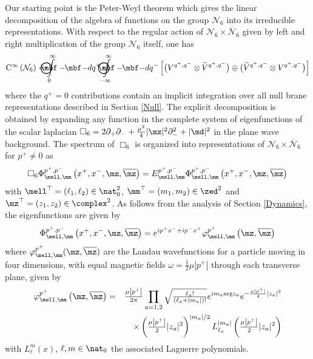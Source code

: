Our starting point is the Peter-Weyl theorem which gives the
linear decomposition of the algebra of functions on the group $\mathcal{N}_6$
into its irreducible representations. With respect to the regular
action of $\mathcal{N}_6\times\overline{\mathcal{N}}_6$ given by left
and right multiplication of the group $\mathcal{N}_6$ itself, one has
\begin{equation}
{\rm C}^\infty\left(\mathcal{N}_6\right)= {\int\limits_0^\infty
\!\!\!\!\!\!\!\!\!\!\!\!  \bigodot\!\!\!\!\!\!\!\!\!\!\mbf-\!\!
\mbf-}  d q^+  {\int\limits_{-\infty}^\infty
\!\!\!\!\!\!\!\!\!\!\!\! \bigodot\!\!\!\!\!\!\!\!\!\!\mbf-\!\!
\mbf-}  d q^- \left[\bigl(V^{q^+,q^-}\otimes\widetilde{V}
{}^{q^+,q^-}\bigr)\oplus\bigl(\widetilde{V}
{}^{q^+,q^-}\otimes V^{q^+,q^-}\bigr)\right]
\label{PeterWeylthm}\end{equation}
where the $q^+=0$ contributions contain an implicit integration over all null
brane representations described in Section \ref{Null}. The explicit
decomposition is obtained by expanding any function in the complete
system of eigenfunctions of the scalar laplacian
$\Box_6=2 \partial_+ \partial_-+\frac{\mu^2}4 |\mz|^2 
\partial_-^2+|\md|^2$ in the plane wave background. The spectrum of
$\Box_6$ is organized into representations of
$\mathcal{N}_6\times\overline{\mathcal{N}}_6$ for $p^+\neq0$ as
\begin{equation}
\Box_6\Phi_{\mell,\mm}^{p^+,p^-}\left(x^+,x^-,\mz,\overline{\mz} \right)=
E_{\mell,\mm}^{p^+,p^-} \Phi_{\mell,\mm}^{p^+,p^-}\left(x^+,x^-,\mz,
\overline{\mz} \right)
\label{Box6eigeneq}\end{equation}
with $\mell^\top=(\ell_1,\ell_2)\in\nat_0^2$, $\mm^\top=(m_1,m_2)\in\zed^2$ and
$\mz^\top=(z_1,z_2)\in\complex^2$. As follows from the analysis of
Section \ref{Dynamics}, the eigenfunctions are given by
\begin{equation}
\Phi_{\mell,\mm}^{p^+,p^-}\left(x^+,x^-,\mz,\overline{\mz} \right)=
 e^{ i p^+x^-+ i
  p^-x^+} \varphi^{p^+}_{\mell,\mm}\left(\mz,\overline{\mz} \right)
\label{Box6eigenfns}\end{equation}
where $\varphi^{p^+}_{\mell,\mm}(\mz,\overline{\mz} )$ are the Landau
wavefunctions for a particle moving in four dimensions, with equal
magnetic fields $\omega=\frac12 \mu |p^+|$ through each transverse
plane, given by
\begin{eqnarray}
\varphi^{p^+}_{\mell,\mm}\left(\mz,\overline{\mz} \right)&=&
\mbox{$\frac{\mu \left|p^+\right|}{2\pi}$} 
\prod_{a=1,2}\sqrt{\mbox{$\frac{\ell_a!}{(\ell_a+|m_a|)!}$}} 
 e^{ i m_a {\rm arg} z_a}  e^{-\frac{\mu |p^+|}4 |z_a|^2}\nonumber\\&&
\times \left(\mbox{$\frac{\mu \left|p^+\right|}2$} |z_a|^2\right)^{|m_a|/2} 
L_{\ell_a}^{|m_a|}\left(\mbox{$\frac{\mu \left|p^+\right|}2$} |z_a|^2\right)
\label{Landauwavefns}\end{eqnarray}
with $L_\ell^m(x)$, $\ell,m\in\nat_0$ the associated Laguerre
polynomials.

